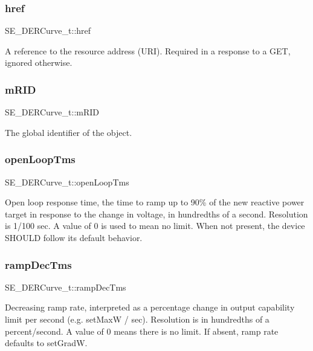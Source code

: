 \subsubsection{\texorpdfstring{href}{href}}
{\footnotesize\ttfamily S\+E\+\_\+\+D\+E\+R\+Curve\+\_\+t\+::href}

A reference to the resource address (U\+RI). Required in a response to a G\+ET, ignored otherwise. \mbox{\label{group__DERCurve_gae779658d736d0fcca90bbe1f932ed0b8}} 
\subsubsection{\texorpdfstring{m\+R\+ID}{mRID}}
{\footnotesize\ttfamily S\+E\+\_\+\+D\+E\+R\+Curve\+\_\+t\+::m\+R\+ID}

The global identifier of the object. \mbox{\label{group__DERCurve_gabd187c05086b853051ae25393be08ef8}} 
\subsubsection{\texorpdfstring{open\+Loop\+Tms}{openLoopTms}}
{\footnotesize\ttfamily S\+E\+\_\+\+D\+E\+R\+Curve\+\_\+t\+::open\+Loop\+Tms}

Open loop response time, the time to ramp up to 90\% of the new reactive power target in response to the change in voltage, in hundredths of a second. Resolution is 1/100 sec. A value of 0 is used to mean no limit. When not present, the device S\+H\+O\+U\+LD follow its default behavior. \mbox{\label{group__DERCurve_ga727ca3765e8a6f57f39c618c73e3db25}} 
\subsubsection{\texorpdfstring{ramp\+Dec\+Tms}{rampDecTms}}
{\footnotesize\ttfamily S\+E\+\_\+\+D\+E\+R\+Curve\+\_\+t\+::ramp\+Dec\+Tms}

Decreasing ramp rate, interpreted as a percentage change in output capability limit per second (e.\+g. set\+MaxW / sec). Resolution is in hundredths of a percent/second. A value of 0 means there is no limit. If absent, ramp rate defaults to set\+GradW. \mbox{\label{group__DERCurve_ga93d46bb90365c6520360905b72b53cd8}} 

